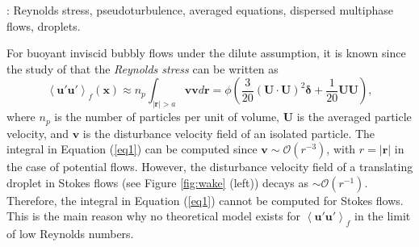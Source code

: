 \documentclass[12pt,a4paper]{article}
\newcommand{\avg}[1]{\left<#1\right>}
\renewcommand{\avg}[1]{\left<#1\right>}
\begin{document}
: Reynolds stress, pseudoturbulence, averaged equations, dispersed multiphase flows, droplets. 

\vspace{10pt}


For buoyant inviscid bubbly flows under the dilute assumption, it is known since the study of \cite{van1982bubble} that the \textit{Reynolds stress} can be written as
\begin{equation}
    \avg{\textbf{u}'\textbf{u}'}_f (\textbf{x})
    \approx
    n_p \int_{|\textbf{r}| > a}\textbf{v}\textbf{v}  d\textbf{r}
    = \phi \left(\frac{3}{20} (\textbf{U}\cdot \textbf{U})^2\bm\delta + \frac{1}{20} \textbf{U}\textbf{U} \right),
    \label{eq1}
\end{equation}
where $n_p$ is the number of particles per unit of volume, $\textbf{U}$ is the averaged particle velocity, and $\textbf{v}$ is the disturbance velocity field of an isolated particle. 
The integral in Equation (\ref{eq1}) can be computed since $\textbf{v} \sim \mathcal{O}(r^{-3})$, with $r =|\textbf{r}|$ in the case of potential flows. 
However, the disturbance velocity field of a translating droplet in Stokes flows (see Figure \ref{fig:wake} (left)) decays as $\sim \mathcal{O}(r^{-1})$. 
Therefore, the integral in Equation (\ref{eq1}) cannot be computed for Stokes flows. 
This is the main reason why no theoretical model exists for $\avg{\textbf{u}'\textbf{u}'}_f$ in the limit of low Reynolds numbers. 

 
\end{document}
